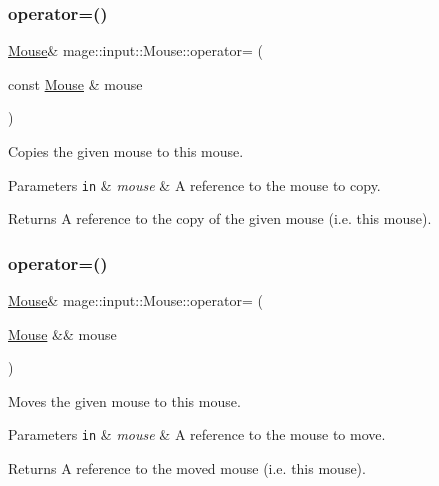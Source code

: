 \subsubsection{\texorpdfstring{operator=()}{operator=()}\hspace{0.1cm}{\footnotesize\ttfamily [1/2]}}
{\footnotesize\ttfamily \mbox{\hyperlink{classmage_1_1input_1_1_mouse}{Mouse}}\& mage\+::input\+::\+Mouse\+::operator= (\begin{DoxyParamCaption}\item[{const \mbox{\hyperlink{classmage_1_1input_1_1_mouse}{Mouse}} \&}]{mouse }\end{DoxyParamCaption})\hspace{0.3cm}{\ttfamily [delete]}}

Copies the given mouse to this mouse.


\begin{DoxyParams}[1]{Parameters}
\mbox{\tt in}  & {\em mouse} & A reference to the mouse to copy. \\
\hline
\end{DoxyParams}
\begin{DoxyReturn}{Returns}
A reference to the copy of the given mouse (i.\+e. this mouse). 
\end{DoxyReturn}
\mbox{\label{classmage_1_1input_1_1_mouse_a05d2471a4f517cc1970df352e7a68724}} 
\subsubsection{\texorpdfstring{operator=()}{operator=()}\hspace{0.1cm}{\footnotesize\ttfamily [2/2]}}
{\footnotesize\ttfamily \mbox{\hyperlink{classmage_1_1input_1_1_mouse}{Mouse}}\& mage\+::input\+::\+Mouse\+::operator= (\begin{DoxyParamCaption}\item[{\mbox{\hyperlink{classmage_1_1input_1_1_mouse}{Mouse}} \&\&}]{mouse }\end{DoxyParamCaption})\hspace{0.3cm}{\ttfamily [delete]}}

Moves the given mouse to this mouse.


\begin{DoxyParams}[1]{Parameters}
\mbox{\tt in}  & {\em mouse} & A reference to the mouse to move. \\
\hline
\end{DoxyParams}
\begin{DoxyReturn}{Returns}
A reference to the moved mouse (i.\+e. this mouse). 
\end{DoxyReturn}
\mbox{\label{classmage_1_1input_1_1_mouse_aa4eb9865206c2b946f8d21106d378907}} 
